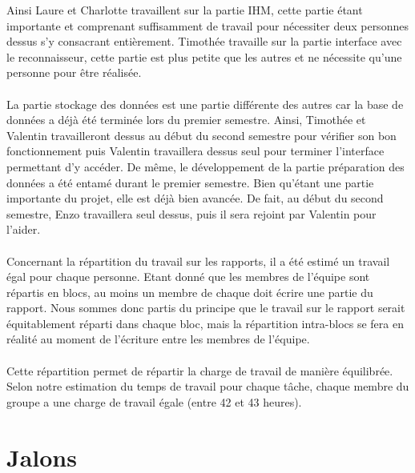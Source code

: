 Ainsi Laure et Charlotte travaillent sur la partie IHM, cette partie étant importante et comprenant suffisamment de travail pour nécessiter deux personnes dessus s’y consacrant entièrement. Timothée travaille sur la partie interface avec le reconnaisseur, cette partie est plus petite que les autres et ne nécessite qu’une personne pour être réalisée. 

\paragraph{}

La partie stockage des données est une partie différente des autres car la base de données a déjà été terminée lors du premier semestre. Ainsi, Timothée et Valentin travailleront dessus au début du second semestre pour vérifier son bon fonctionnement puis Valentin travaillera dessus seul pour terminer l’interface permettant d’y accéder. De même, le développement de la partie préparation des données a été entamé durant le premier semestre. Bien qu’étant une partie importante du projet, elle est déjà bien avancée. De fait, au début du second semestre, Enzo travaillera seul dessus, puis il sera rejoint par Valentin pour l’aider.

\paragraph{}

Concernant la répartition du travail sur les rapports, il a été estimé un travail égal pour chaque personne. Etant donné que les membres de l’équipe sont répartis en blocs, au moins un membre de chaque doit écrire une partie du rapport. Nous sommes donc partis du principe que le travail sur le rapport serait équitablement réparti dans chaque bloc, mais la répartition intra-blocs se fera en réalité au moment de l’écriture entre les membres de l’équipe.

\paragraph{}

Cette répartition permet de répartir la charge de travail de manière équilibrée. Selon notre estimation du temps de travail pour chaque tâche, chaque membre du groupe a une charge de travail égale (entre 42 et 43 heures).

\section{Jalons}

